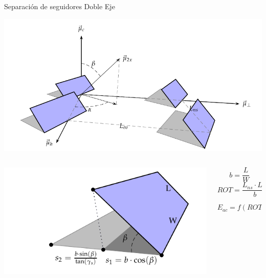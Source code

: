 \documentclass[xcolor={usenames,svgnames,dvipsnames}]{beamer}
\begin{document}
\begin{frame}[label={sec:org2604323}]{Separación de seguidores Doble Eje}
\begin{center}
\includegraphics[height=0.5\textheight]{../figs/Sombras2X.pdf}
\end{center}

\begin{columns}
\begin{column}{0.6\columnwidth}
\begin{center}
\includegraphics[width=.9\linewidth]{../figs/DimensionesSeguidorSombra.pdf}
\end{center}
\end{column}

\begin{column}{0.4\columnwidth}
$$b=\frac{L}{W}$$ 
$$ROT=\frac{L_{ns}\cdot L_{eo}}{b}$$

$$E_{ac}=f(ROT)??$$
\end{column}
\end{columns}
\end{frame}
\end{document}
